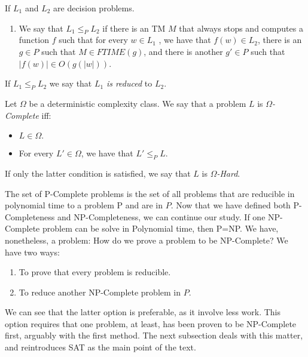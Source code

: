 

\begin{definition}
  If $L_1$ and $L_2$ are decision problems.
\begin{enumerate}
\item We say that $L_1 \le_P L_2$ if there is an TM $M$ that always stops and computes a function $f$ such that for every $w \in L_1$ , we have that $f(w) \in L_2$, there is an $g\in P$ such that $M \in FTIME(g)$, and there is another $g'\in P$ such that $|f(w)| \in O(g(|w|))$.
\end{enumerate}
If $L_1 \le_{P} L_2$ we say that $L_1$ \emph{is reduced} to $L_2$.
\end{definition}




\begin{definition}
  Let $\Omega$ be a deterministic complexity class.  We say that a problem $L$ is $\Omega$\emph{-Complete} iff:
  \begin{itemize}
  \item $L \in\Omega.$
  \item For every $L' \in \Omega$, we have that $L' \le_P L$.
  \end{itemize}

If only the latter condition is satisfied, we say that $L$ is $\Omega$\emph{-Hard}.

\end{definition}


The set of P-Complete problems is the set of all problems that are reducible in polynomial time to a problem P and are in $P$. Now that we have defined both P-Completeness and NP-Completeness, we can continue our study. If one NP-Complete problem can be solve in Polynomial time, then P=NP. We have, nonetheless, a problem: How do we prove a problem to be NP-Complete? We have two ways:
\begin{enumerate}
\item To prove that every problem is reducible.
\item To reduce another NP-Complete problem in $P$.
\end{enumerate}

We can see that the latter option is preferable, as it involve less work. This option requires that one problem, at least, has been proven to be NP-Complete first, arguably with the first method. The next subsection deals with this matter, and reintroduces SAT as the main point of the text. 


